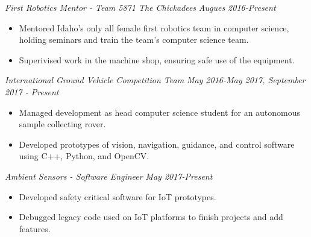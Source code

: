 \documentclass[letterpaper]{article}
\begin{document}
\vspace{.06in}

\begin{multicols}{2}
\textit{First Robotics Mentor - Team 5871 The Chickadees}
\vfill
\columnbreak
\textit{Augues 2016-Present}
\end{multicols}
\begin{itemize}
    \item Mentored Idaho's only all female first robotics team in computer
        science, holding seminars
        and train the team's computer science team.
    \item Superivised work in the machine shop, ensuring safe use of the equipment. 
\end{itemize}

\vspace{.06in}

\begin{multicols}{2}
\textit{International Ground Vehicle Competition Team}
\vfill
\columnbreak
\textit{May 2016-May 2017, September 2017 - Present}
\end{multicols}
\begin{itemize}
    \item Managed development as head computer science student for an autonomous sample collecting rover.
    \item Developed prototypes of vision, navigation, guidance, and control software using C++, Python, and OpenCV. 
\end{itemize}

\begin{multicols}{2}
\textit{Ambient Sensors - Software Engineer}
\vfill
\columnbreak
\textit{May 2017-Present}
\end{multicols}
\begin{itemize}
    \item Developed safety critical software for IoT prototypes.
    \item Debugged legacy code used on IoT platforms to finish projects and add features.
\end{itemize}
\end{document}
